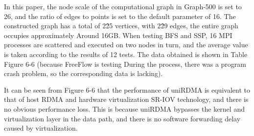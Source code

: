\documentclass[sigplan,screen]{acmart}
\begin{document}
In this paper, the node scale of the computational graph in Graph-500 is set to 26, and the ratio of edges to points is set to the default parameter of 16. The constructed graph has a total of 2\^25 vertices, with 2\^29 edges, the entire graph occupies approximately Around 16GB. When testing BFS and SSP, 16 MPI processes are scattered and executed on two nodes in turn, and the average value is taken according to the results of 12 tests. The data obtained is shown in Table Figure 6-6 (because FreeFlow is testing During the process, there was a program crash problem, so the corresponding data is lacking).

It can be seen from Figure 6-6 that the performance of uniRDMA is equivalent to that of host RDMA and hardware virtualization SR-IOV technology, and there is no obvious performance loss. This is because uniRDMA bypasses the kernel and virtualization layer in the data path, and there is no software forwarding delay caused by virtualization.
\end{document}
